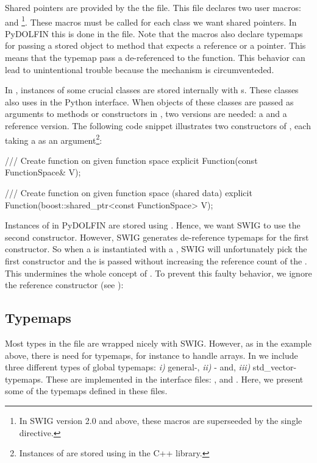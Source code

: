 Shared pointers are provided by the the  file. 
This file declares two user macros: \-\-
and \-\-\footnote{In SWIG
version 2.0 and above, these macros are superseeded by the single
 directive.}. These macros must be called for each class we
want shared pointers.  In PyDOLFIN this is done in the  file. 
Note that the macros also declare typemaps for passing a
 stored object to method that expects a reference or
a pointer. This means that the typemap pass a
de-referenced  to the function. This behavior can lead to
unintentional trouble because the  mechanism is circumventeded.

In \dolfin, instances of some crucial classes are stored internally with
s. These classes also uses  in the Python
interface. When objects of these classes are passed as arguments to methods
or constructors in \dolfin, two versions are needed: a  and a reference version. The following code snippet illustrates two constructors of , each taking a  as an argument\footnote{Instances of  are stored using  in the \dolfin C++ library.}:
\begin{c++}
/// Create function on given function space
explicit Function(const FunctionSpace& V);

/// Create function on given function space (shared data)
explicit Function(boost::shared_ptr<const FunctionSpace> V);
\end{c++}
Instances of  in PyDOLFIN are stored using
. Hence, we want SWIG to use the second constructor. However, 
SWIG generates de-reference typemaps for the first constructor. So when a
 is instantiated with a , SWIG will
unfortunately pick the first constructor and the  is
passed without increasing the reference count of the .
This undermines the whole concept of . To prevent this
faulty behavior, we ignore the reference constructor (see ):
\begin{c++}
\end{c++}

\subsection{Typemaps}
Most types in the  file are wrapped nicely
with SWIG. However, as in the  example above, there is need for 
typemaps, for instance to handle \numpy arrays.  
In  we include three different types of global typemaps:
\textit{i)} general-, \textit{ii)} \numpy- and, \textit{iii)}
std\_vector-typemaps. These are implemented in the interface files:
,  and
. Here, we present some of the typemaps defined in these files.


